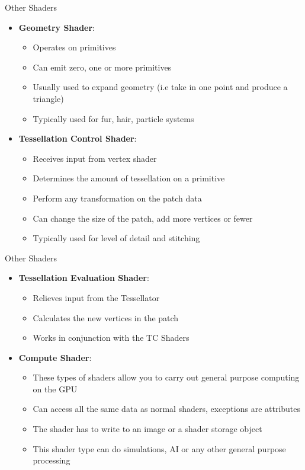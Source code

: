 \begin{frame}{Other Shaders}
\begin{itemize}
	\pause\item \textbf{Geometry Shader}:
	\begin{itemize}
		\pause \item Operates on primitives
		\pause \item Can emit zero, one or more primitives
		\pause \item Usually used to expand geometry (i.e take in one point and produce a triangle)  
		\pause \item Typically used for fur, hair, particle systems
	\end{itemize}  
	\pause\item \textbf{Tessellation Control Shader}:
	\begin{itemize}
		\pause \item Receives input from vertex shader 
		\pause \item Determines the amount of tessellation on a primitive 
		\pause \item Perform any transformation on the patch data
		\pause \item Can change the size of the patch, add more vertices or fewer
		\pause \item Typically used for level of detail and stitching 
	\end{itemize}
\end{itemize}
\end{frame}

\begin{frame}{Other Shaders}
\begin{itemize}
	\pause\item \textbf{Tessellation Evaluation Shader}:
	\begin{itemize}
		\pause \item Relieves input from the Tessellator 
		\pause \item Calculates the new vertices in the patch
		\pause \item Works in conjunction with the TC Shaders 
	\end{itemize}
	\pause\item \textbf{Compute Shader}:
	\begin{itemize}
		\pause \item These types of shaders allow you to carry out general purpose computing on the GPU
		\pause \item Can access all the same data as normal shaders, exceptions are attributes
		\pause \item The shader has to write to an image or a shader storage object
		\pause \item This shader type can do simulations, AI or any other general purpose processing
	\end{itemize}
\end{itemize}
\end{frame}
